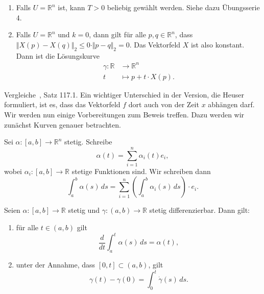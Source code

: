 \documentclass[../main.tex]{subfiles}
\begin{document}
\begin{remark}
  \leavevmode
  \begin{enumerate}[\normalfont1.]
    \item Falls $U = \mathbb{R}^n$ ist, kann $T > 0$ 
      beliebig gewählt werden.
      Siehe dazu Übungsserie 4.
    \item Falls $U = \mathbb{R}^n$ und $k = 0$, 
      dann gilt für alle $p,q \in \mathbb{R}^n$,
      dass 
      $\Vert X(p)  - X(q) \Vert_2 
      \leq 0 \cdot \Vert p - q \Vert_2 = 0$.
      Das Vektorfeld $X$ ist also konstant.
      Dann ist die Lösungskurve
      \begin{align*}
        \gamma \colon \mathbb{R} & \to \mathbb{R}^n \\
        t & \mapsto p + t \cdot X(p).
      \end{align*}
  \end{enumerate}
\end{remark}


Vergleiche~\cite{heuser}, Satz 117.1.
Ein wichtiger Unterschied in der Version,
die Heuser formuliert, ist es,
dass das Vektorfeld $f$ dort auch von der Zeit $x$
abhängen darf.
Wir werden nun einige Vorbereitungen zum Beweis
treffen.
Dazu werden wir zunächst Kurven genauer betrachten.

\begin{definition}
  Sei $\alpha \colon [a, b] \to \mathbb{R}^n$ stetig.
  Schreibe 
  \[\alpha(t) = \sum_{i=1}^{n} \alpha_i(t) e_i,
  \]
  wobei $\alpha_i \colon [a, b] \to \mathbb{R}$ stetige Funktionen sind.
  Wir schreiben dann
  \[
    \int_{a}^{b} \alpha(s) \, ds
    = \sum_{i=1}^{n} \left( 
      \int_a^b
      \alpha_i(s) \, ds
    \right) \cdot e_i.
  \]
\end{definition}

\begin{proposition}
  Seien $\alpha \colon [a, b] \to \mathbb{R}$ stetig
  und $\gamma \colon (a, b) \to \mathbb{R}$ 
  stetig differenzierbar.
  Dann gilt:
  \begin{enumerate}[\normalfont(i)]
    \item für alle $t \in (a, b)$ gilt
      \[
        \frac{d}{dt} \int_{a}^{t} \alpha(s) \, ds = \alpha(t),
      \]
    \item unter der Annahme, dass $[0, t] \subset (a, b)$, gilt
      \[
        \gamma(t) - \gamma(0) = \int_{0}^{t} \dot \gamma(s) \, ds.
      \]
  \end{enumerate}
\end{proposition}
\end{document}
